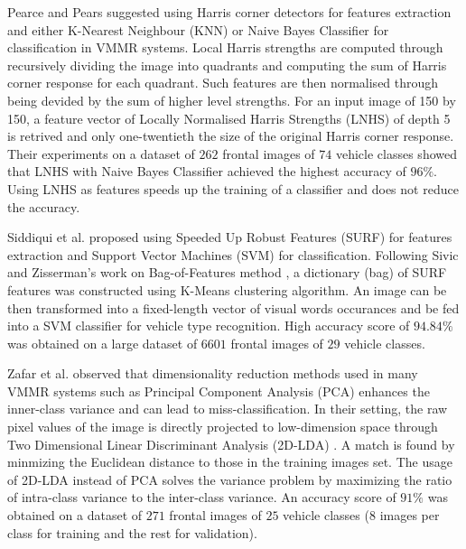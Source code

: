 Pearce and Pears \citep{pearce2011automatic} suggested using Harris corner detectors \citep{harris1988combined} for features extraction and either K-Nearest Neighbour (KNN) or Naive Bayes Classifier for classification in VMMR systems.
Local Harris strengths are computed through recursively dividing the image into quadrants and computing the sum of Harris corner response for each quadrant.
Such features are then normalised through being devided by the sum of higher level strengths.
For an input image of 150 by 150, a feature vector of Locally Normalised Harris Strengths (LNHS) of depth 5 is retrived and only one-twentieth the size of the original Harris corner response.
Their experiments on a dataset of $262$ frontal images of $74$ vehicle classes showed that LNHS with Naive Bayes Classifier achieved the highest accuracy of $96\%$. 
Using LNHS as features speeds up the training of a classifier and does not reduce the accuracy.


Siddiqui et al. \citep{siddiqui2016real} proposed using Speeded Up Robust Features (SURF) \citep{bay2006surf} for features extraction and Support Vector Machines (SVM) for classification.
Following Sivic and Zisserman's work on Bag-of-Features method \citep{sivic2003video}, a dictionary (bag) of SURF features was constructed using K-Means clustering algorithm.
An image can be then transformed into a fixed-length vector of visual words occurances and be fed into a SVM classifier for vehicle type recognition.
High accuracy score of $94.84\%$ was obtained on a large dataset of $6601$ frontal images of $29$ vehicle classes.


Zafar et al. \citep{zafar2007two} observed that dimensionality reduction methods used in many VMMR systems such as Principal Component Analysis (PCA) enhances the inner-class variance and can lead to miss-classification.
In their setting, the raw pixel values of the image is directly projected to low-dimension space through Two Dimensional Linear Discriminant Analysis (2D-LDA) \citep{li20052d}.
A match is found by minmizing the Euclidean distance to those in the training images set.
The usage of 2D-LDA instead of PCA solves the variance problem by maximizing the ratio of intra-class variance to the inter-class variance.
An accuracy score of $91\%$ was obtained on a dataset of $271$ frontal images of $25$ vehicle classes ($8$ images per class for training and the rest for validation).

